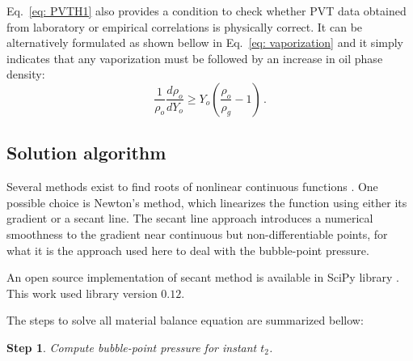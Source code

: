 \documentclass[authoryear,preprint,review,11pt]{elsarticle}
\newtheorem{step}{Step}
\begin{document}
Eq.~\eqref{eq: PVTH1} also provides a condition to check whether PVT data obtained from laboratory or empirical correlations is physically correct. It can be alternatively formulated as shown bellow in Eq.~\eqref{eq: vaporization} and it simply indicates that any vaporization must be followed by an increase in oil phase density:
\begin{equation}\label{eq: vaporization}
\frac{1}{\rho_o}\frac{d\rho_o}{dY_o} \geq Y_o \left( \frac{\rho_o}{\rho_g} - 1 \right) \, .
\end{equation}



\subsection{Solution algorithm}
Several methods exist to find roots of nonlinear continuous functions \citep{hamming1987numerical}. One possible choice is Newton's method, which linearizes the function using either its gradient or a secant line. The secant line approach introduces a numerical smoothness to the gradient near continuous but non-differentiable points, for what it is the approach used here to deal with the bubble-point pressure.

An open source implementation of secant method is available in SciPy library \citep{scipy}. This work used library version $0.12$.




The steps to solve all material balance equation are summarized bellow:
\begin{step}
Compute bubble-point pressure for instant $t_2$.
\end{step}
\end{document}
